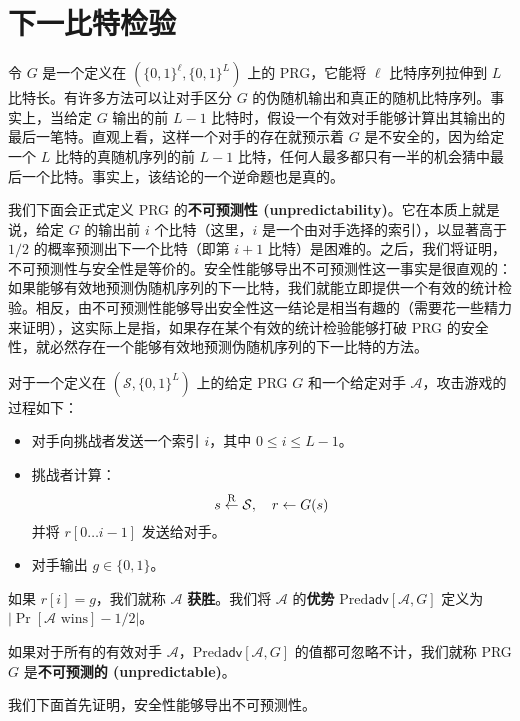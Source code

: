 \section{下一比特检验}\label{sec:3-5}

令 $G$ 是一个定义在 $(\{0,1\}^\ell,\{0,1\}^L)$ 上的 PRG，它能将 $\ell$ 比特序列拉伸到 $L$ 比特长。有许多方法可以让对手区分 $G$ 的伪随机输出和真正的随机比特序列。事实上，当给定 $G$ 输出的前 $L-1$ 比特时，假设一个有效对手能够计算出其输出的最后一笔特。直观上看，这样一个对手的存在就预示着 $G$ 是不安全的，因为给定一个 $L$ 比特的真随机序列的前 $L-1$ 比特，任何人最多都只有一半的机会猜中最后一个比特。事实上，该结论的一个逆命题也是真的。

我们下面会正式定义 PRG 的\textbf{不可预测性 (unpredictability)}。它在本质上就是说，给定 $G$ 的输出前 $i$ 个比特（这里，$i$ 是一个由对手选择的索引），以显著高于 $1/2$ 的概率预测出下一个比特（即第 $i+1$ 比特）是困难的。之后，我们将证明，不可预测性与安全性是等价的。安全性能够导出不可预测性这一事实是很直观的：如果能够有效地预测伪随机序列的下一比特，我们就能立即提供一个有效的统计检验。相反，由不可预测性能够导出安全性这一结论是相当有趣的（需要花一些精力来证明），这实际上是指，如果存在某个有效的统计检验能够打破 PRG 的安全性，就必然存在一个能够有效地预测伪随机序列的下一比特的方法。

\begin{game}\label{game:3-2}
对于一个定义在 $(\mathcal{S},\{0,1\}^L)$ 上的给定 PRG $G$ 和一个给定对手 $\mathcal{A}$，攻击游戏的过程如下：
\begin{itemize}
	\item 对手向挑战者发送一个索引 $i$，其中 $0\leq i\leq L-1$。
	\item 挑战者计算：
	\[
	s\overset{\rm R}\leftarrow\mathcal{S},
	\quad
	r\leftarrow G(s)
	\]
	并将 $r[0\dots i-1]$ 发送给对手。
	\item 对手输出 $g\in\{0,1\}$。
\end{itemize}
如果 $r[i]=g$，我们就称 $\mathcal{A}$ \textbf{获胜}。我们将 $\mathcal{A}$ 的\textbf{优势} $\mathrm{Pred}\mathsf{adv}[\mathcal{A},G]$ 定义为 $|\Pr[\mathcal{A}\text{ wins}]-1/2|$。
\end{game}

\begin{definition}\label{def:3-3}
如果对于所有的有效对手 $\mathcal{A}$，$\mathrm{Pred}\mathsf{adv}[\mathcal{A},G]$ 的值都可忽略不计，我们就称 PRG $G$ 是\textbf{不可预测的 (unpredictable)}。
\end{definition}

我们下面首先证明，安全性能够导出不可预测性。

